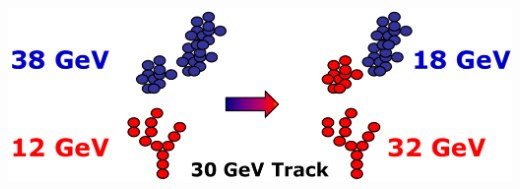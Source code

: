 \documentclass[8pt]{beamer}
\begin{document}
\begin{frame}
\begin{minipage}{0.37\linewidth}
\begin{center}
        \includegraphics[width=\linewidth]{PandoraReclustering-MergeSplit.pdf}
      \end{center}
    \end{minipage}
  \end{frame}
\end{document}
